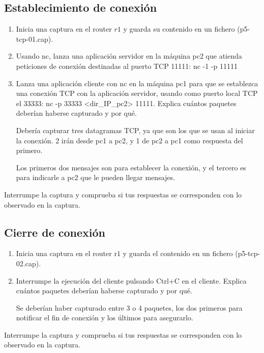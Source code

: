 \documentclass[12pt, a4paper]{report}
\begin{document}
\subsection{Establecimiento de conexión}
\begin{enumerate}
	\item Inicia una captura en el router $r 1$ y guarda su contenido en un fichero (p5-tcp-01.cap).
	
	\item Usando nc, lanza una aplicación servidor en la máquina pc2 que atienda peticiones de conexión destinadas al puerto TCP 11111: nc -1 -p 11111
	
	\item Lanza una aplicación cliente con nc en la máquina pc1 para que se establezca una conexión TCP con la aplicación servidor, usando como puerto local TCP el 33333: nc -p 33333 <dir\_IP\_pc2> 11111. Explica cuántos paquetes deberían haberse capturado y por qué.
	
	Debería capturar tres datagramas TCP, ya que son los que se usan al iniciar la conexión. 2 irán desde pc1 a pc2, y 1 de pc2 a pc1 como respuesta del primero.
	
	Los primeros dos mensajes son para establecer la conexión, y el tercero es para indicarle a pc2 que le pueden llegar mensajes.
	
\end{enumerate}

Interrumpe la captura y comprueba si tus respuestas se corresponden con lo observado en la captura.

\subsection{Cierre de conexión}
\begin{enumerate}
	\item Inicia una captura en el router $\mathrm{r} 1$ y guarda el contenido en un fichero (p5-tcp-02.cap).
	
	\item Interrumpe la ejecución del cliente pulsando Ctrl+C en el cliente. Explica cuántos paquetes deberían haberse capturado y por qué.
	
	Se deberían haber capturado entre 3 o 4 paquetes, los dos primeros para notificar el fin de conexión y los últimos para asegurarlo.
	
\end{enumerate}

Interrumpe la captura y comprueba si tus respuestas se corresponden con lo observado en la captura.
\end{document}
